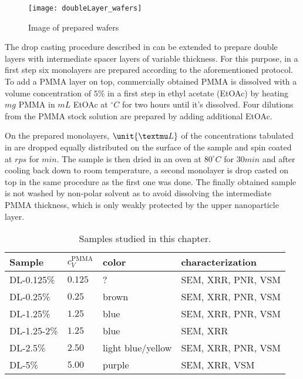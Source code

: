\documentclass[\main/dresen_thesis.tex]{subfiles}
\begin{document}
  \begin{figure}[tb]
    \centering
    \texttt{[image: doubleLayer\_wafers]}
    \caption{\label{fig:doubleLayers:preparation:waferImage}Image of prepared wafers}
  \end{figure}

  The drop casting procedure described in  can be extended to prepare double layers with intermediate spacer layers of variable thickness.
  For this purpose, in a first step six monolayers are prepared according to the aforementioned protocol.
  To add a PMMA layer on top, commercially obtained PMMA is dissolved with a volume concentration of $5 \%$ in a first step in ethyl acetate (EtOAc) by heating $ \unit{mg}$ PMMA in $ \unit{mL}$ EtOAc at $ \unit{^\circ C}$ for two hours until it's dissolved.
  Four dilutions from the PMMA stock solution are prepared by adding additional EtOAc.
  
  On the prepared monolayers, $ \unit{\textmu L}$ of the concentrations tabulated in  are dropped equally distributed on the surface of the sample and spin coated at $ \unit{rps}$ for $ \unit{min}$.
  The sample is then dried in an oven at $80 ^\circ C$ for $30 \unit{min}$ and after cooling back down to room temperature, a second monolayer is drop casted on top in the same procedure as the first one was done.
  The finally obtained sample is not washed by non-polar solvent as to avoid dissolving the intermediate PMMA thickness, which is only weakly protected by the upper nanoparticle layer.

  \begin{table}[!htbp]
    \centering
    \caption{\label{tab:doubleLayers:preparation:samples}Samples studied in this chapter.}
    \begin{tabular}{ l | l | l | l}
      \textbf{Sample}  & $c_V^\mathrm{PMMA}$ & color & characterization\\
      \hline
      DL-0.125\%    & $0.125$ & ?               & SEM, XRR, PNR, VSM\\
      DL-0.25\%     & $0.25$ & brown            & SEM, XRR, PNR, VSM\\
      DL-1.25\%     & $1.25$ & blue             & SEM, XRR, PNR, VSM\\
      DL-1.25-2\%   & $1.25$ & blue             & SEM, XRR\\
      DL-2.5\%      & $2.50$ & light blue/yellow& SEM, XRR, PNR, VSM\\
      DL-5\%        & $5.00$ & purple           & SEM, XRR, VSM\\
      \hline
    \end{tabular}
  \end{table}

\end{document}
